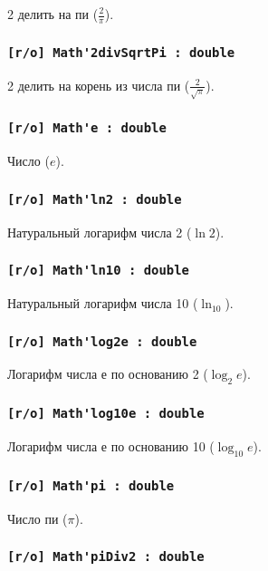 2 делить на пи ($\frac{2}{\pi}$).

\subsubsection{\lstinline|[r/o] Math'2divSqrtPi : double|}

2 делить на корень из числа пи ($\frac{2}{\sqrt{\pi}}$).

\subsubsection{\lstinline|[r/o] Math'e : double|}

Число ($e$).

\subsubsection{\lstinline|[r/o] Math'ln2 : double|}

Натуральный логарифм числа 2 ($\ln{2}$).

\subsubsection{\lstinline|[r/o] Math'ln10 : double|}

Натуральный логарифм числа 10 ($\ln_{10}$).

\subsubsection{\lstinline|[r/o] Math'log2e : double|}

Логарифм числа е по основанию 2 ($\log_{2}{e}$).

\subsubsection{\lstinline|[r/o] Math'log10e : double|}

Логарифм числа е по основанию 10 ($\log_{10}{e}$).

\subsubsection{\lstinline|[r/o] Math'pi : double|}

Число пи ($\pi$).

\subsubsection{\lstinline|[r/o] Math'piDiv2 : double|}

